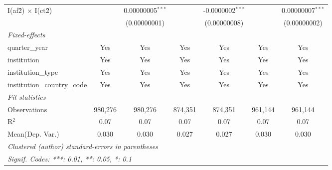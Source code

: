 \begin{tabular}{lcccccc}
   I(af\^2) $\times$ I(ct\^2)         &               & 0.00000005$^{***}$ &                & -0.0000002$^{***}$ &               & 0.00000007$^{***}$\\   
                                      &               & (0.00000001)       &                & (0.00000008)       &               & (0.00000002)\\   
   \midrule
   \emph{Fixed-effects}\\
   quarter\_year                      & Yes           & Yes                & Yes            & Yes                & Yes           & Yes\\  
   institution                        & Yes           & Yes                & Yes            & Yes                & Yes           & Yes\\  
   institution\_type                  & Yes           & Yes                & Yes            & Yes                & Yes           & Yes\\  
   institution\_country\_code         & Yes           & Yes                & Yes            & Yes                & Yes           & Yes\\  
   \midrule
   \emph{Fit statistics}\\
   Observations                       & 980,276       & 980,276            & 874,351        & 874,351            & 961,144       & 961,144\\  
   R$^2$                              & 0.07          & 0.07               & 0.07           & 0.07               & 0.07          & 0.07\\  
Mean(Dep. Var.) & 0.030 & 0.030 & 0.027 & 0.027 & 0.030 & 0.030 \\
   \midrule \midrule
   \multicolumn{7}{l}{\emph{Clustered (author) standard-errors in parentheses}}\\
   \multicolumn{7}{l}{\emph{Signif. Codes: ***: 0.01, **: 0.05, *: 0.1}}\\
\end{tabular}
\par\endgroup
